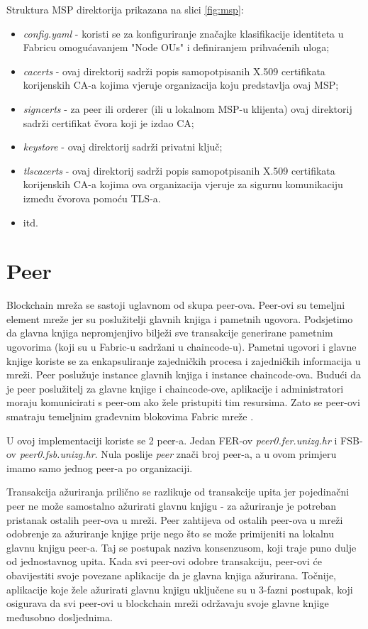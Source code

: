 \documentclass[times, utf8, diplomski]{fer}
\begin{document}
Struktura MSP direktorija prikazana na slici \ref{fig:msp}:

\begin{itemize}
\item \textit{config.yaml} - koristi se za konfiguriranje značajke klasifikacije identiteta u Fabricu omogućavanjem "Node OUs" i definiranjem prihvaćenih uloga;
\item \textit{cacerts} - ovaj direktorij sadrži popis samopotpisanih X.509 certifikata korijenskih CA-a kojima vjeruje organizacija koju predstavlja ovaj MSP;
\item \textit{signcerts} - za peer ili orderer (ili u lokalnom MSP-u klijenta) ovaj direktorij sadrži certifikat čvora koji je izdao CA;
\item \textit{keystore} - ovaj direktorij sadrži privatni ključ;
\item \textit{tlscacerts} - ovaj direktorij sadrži popis samopotpisanih X.509 certifikata korijenskih CA-a kojima ova organizacija vjeruje za sigurnu komunikaciju između čvorova pomoću TLS-a.
\item itd.
\end{itemize}

\section{Peer}
Blockchain mreža se sastoji uglavnom od skupa peer-ova. Peer-ovi su temeljni element mreže jer su poslužitelji glavnih knjiga i pametnih ugovora. Podsjetimo da glavna knjiga nepromjenjivo bilježi sve transakcije generirane pametnim ugovorima (koji su u Fabric-u sadržani u chaincode-u). Pametni ugovori i glavne knjige koriste se za enkapsuliranje zajedničkih procesa i zajedničkih informacija u mreži.
Peer poslužuje instance glavnih knjiga i instance chaincode-ova.
Budući da je peer poslužitelj za glavne knjige i chaincode-ove,  aplikacije i administratori moraju komunicirati s peer-om ako žele pristupiti tim resursima. Zato se peer-ovi smatraju temeljnim građevnim blokovima Fabric mreže \cite{Fabric}. 

U ovoj implementaciji koriste se 2 peer-a. Jedan FER-ov \textit{peer0.fer.unizg.hr }i FSB-ov \textit{peer0.fsb.unizg.hr}. Nula poslije \textit{peer} znači broj peer-a, a u ovom primjeru imamo samo jednog peer-a po organizaciji.  

Transakcija ažuriranja prilično se razlikuje od transakcije upita jer pojedinačni peer ne može samostalno ažurirati glavnu knjigu - za ažuriranje je potreban pristanak ostalih peer-ova u mreži. Peer zahtijeva od ostalih peer-ova u mreži odobrenje za ažuriranje knjige prije nego što se može primijeniti na lokalnu glavnu knjigu peer-a. Taj se postupak naziva konsenzusom,  koji traje puno dulje od jednostavnog upita. Kada svi peer-ovi odobre transakciju,  peer-ovi će obavijestiti svoje povezane aplikacije da je glavna knjiga ažurirana.  Točnije, aplikacije koje žele ažurirati glavnu knjigu uključene su u 3-fazni postupak, koji osigurava da svi peer-ovi u blockchain mreži održavaju svoje glavne knjige međusobno dosljednima.
\end{document}

